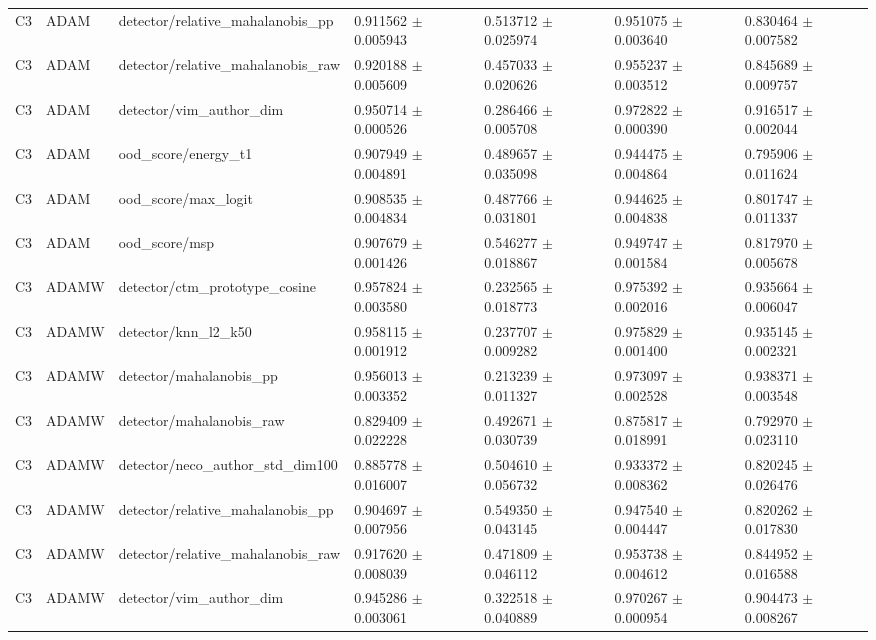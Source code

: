 \begin{longtable}{lllllll}
C3 & ADAM & detector/relative\_mahalanobis\_pp & 0.911562 $\pm$ 0.005943 & 0.513712 $\pm$ 0.025974 & 0.951075 $\pm$ 0.003640 & 0.830464 $\pm$ 0.007582 \\
C3 & ADAM & detector/relative\_mahalanobis\_raw & 0.920188 $\pm$ 0.005609 & 0.457033 $\pm$ 0.020626 & 0.955237 $\pm$ 0.003512 & 0.845689 $\pm$ 0.009757 \\
C3 & ADAM & detector/vim\_author\_dim & 0.950714 $\pm$ 0.000526 & 0.286466 $\pm$ 0.005708 & 0.972822 $\pm$ 0.000390 & 0.916517 $\pm$ 0.002044 \\
C3 & ADAM & ood\_score/energy\_t1 & 0.907949 $\pm$ 0.004891 & 0.489657 $\pm$ 0.035098 & 0.944475 $\pm$ 0.004864 & 0.795906 $\pm$ 0.011624 \\
C3 & ADAM & ood\_score/max\_logit & 0.908535 $\pm$ 0.004834 & 0.487766 $\pm$ 0.031801 & 0.944625 $\pm$ 0.004838 & 0.801747 $\pm$ 0.011337 \\
C3 & ADAM & ood\_score/msp & 0.907679 $\pm$ 0.001426 & 0.546277 $\pm$ 0.018867 & 0.949747 $\pm$ 0.001584 & 0.817970 $\pm$ 0.005678 \\
C3 & ADAMW & detector/ctm\_prototype\_cosine & 0.957824 $\pm$ 0.003580 & 0.232565 $\pm$ 0.018773 & 0.975392 $\pm$ 0.002016 & 0.935664 $\pm$ 0.006047 \\
C3 & ADAMW & detector/knn\_l2\_k50 & 0.958115 $\pm$ 0.001912 & 0.237707 $\pm$ 0.009282 & 0.975829 $\pm$ 0.001400 & 0.935145 $\pm$ 0.002321 \\
C3 & ADAMW & detector/mahalanobis\_pp & 0.956013 $\pm$ 0.003352 & 0.213239 $\pm$ 0.011327 & 0.973097 $\pm$ 0.002528 & 0.938371 $\pm$ 0.003548 \\
C3 & ADAMW & detector/mahalanobis\_raw & 0.829409 $\pm$ 0.022228 & 0.492671 $\pm$ 0.030739 & 0.875817 $\pm$ 0.018991 & 0.792970 $\pm$ 0.023110 \\
C3 & ADAMW & detector/neco\_author\_std\_dim100 & 0.885778 $\pm$ 0.016007 & 0.504610 $\pm$ 0.056732 & 0.933372 $\pm$ 0.008362 & 0.820245 $\pm$ 0.026476 \\
C3 & ADAMW & detector/relative\_mahalanobis\_pp & 0.904697 $\pm$ 0.007956 & 0.549350 $\pm$ 0.043145 & 0.947540 $\pm$ 0.004447 & 0.820262 $\pm$ 0.017830 \\
C3 & ADAMW & detector/relative\_mahalanobis\_raw & 0.917620 $\pm$ 0.008039 & 0.471809 $\pm$ 0.046112 & 0.953738 $\pm$ 0.004612 & 0.844952 $\pm$ 0.016588 \\
C3 & ADAMW & detector/vim\_author\_dim & 0.945286 $\pm$ 0.003061 & 0.322518 $\pm$ 0.040889 & 0.970267 $\pm$ 0.000954 & 0.904473 $\pm$ 0.008267 \\

\end{longtable}
